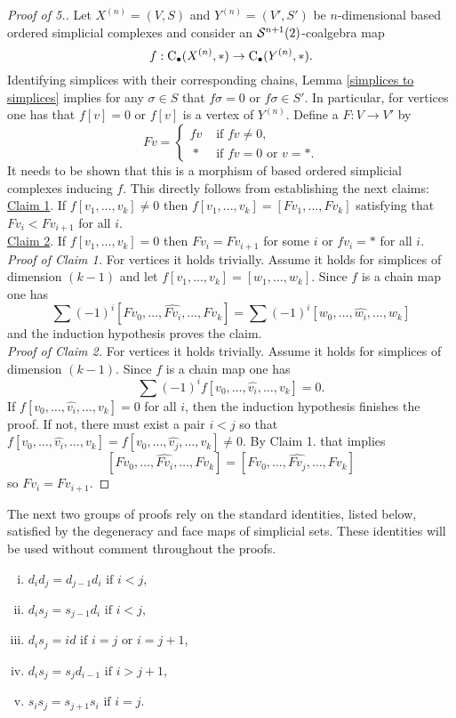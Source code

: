 \documentclass[main.tex]{subfiles}
\begin{document}
\begin{proof}[Proof of 5.]
Let $X^{(n)}=(V,S)$ and $Y^{(n)}=(V',S')$ be $n$-dimensional based ordered simplicial complexes and consider an $\S^{n+1}(2)$-coalgebra map $$f:\chains(X^{(n)},\ast)\to\chains(Y^{(n)},\ast).$$
Identifying simplices with their corresponding chains, Lemma \ref{simplices to simplices} implies for any $\sigma\in S$ that $f\sigma=0$ or $f\sigma\in S'$. In particular, for vertices one has that $f[v]=0$ or $f[v]$ is a vertex of $Y^{(n)}$. Define a $F:V\to V'$ by
$$Fv=\begin{cases}fv & \text{ if } fv\neq0, \\ \ \ast & \text{ if } fv=0 \text{ or } v=\ast.\end{cases}$$
It needs to be shown that this is a morphism of based ordered simplicial complexes inducing $f$. This directly follows from establishing the next \vspace*{5pt}claims:
\underline{Claim 1}. If $f[v_1,...,v_k]\neq0$ then $f[v_1,...,v_k]=[Fv_1,...,Fv_k]$ satisfying that $Fv_i<Fv_{i+1}$ for all $i$. \vspace*{5pt} \\
\underline{Claim 2}. If $f[v_1,...,v_k]=0$ then $Fv_{i}=Fv_{i+1}$ for some $i$ or $fv_i=\ast$ for all $i$.\vspace*{9pt} \\
\textit{Proof of Claim 1.} For vertices it holds trivially. Assume it holds for simplices of dimension $(k-1)$ and let $f[v_1,...,v_k]=[w_1,\dotsc,w_k]$. Since $f$ is a chain map one has
$$\sum(-1)^i[Fv_0,\dotsc,\widehat{Fv_i},\dotsc,Fv_k]=\sum(-1)^i[w_0,\dotsc,\widehat{w_i},\dotsc,w_k]$$
and the induction hypothesis proves the claim.\vspace*{9pt} \\
\textit{Proof of Claim 2.} For vertices it holds trivially. Assume it holds for simplices of dimension $(k-1)$. Since $f$ is a chain map one has
$$\sum(-1)^if[v_0,\dotsc,\widehat{v_i},\dotsc,v_k]=0.$$
If $f[v_0,\dotsc,\widehat{v_i},\dotsc,v_k]=0$ for all $i$, then the induction hypothesis finishes the proof. If not, there must exist a pair $i<j$ so that $f[v_0,\dotsc,\widehat{v_i},\dotsc,v_k]=f[v_0,\dotsc,\widehat{v_j},\dotsc,v_k]\neq0$. By Claim 1. that implies $$[Fv_0,\dotsc,\widehat{Fv_i},\dotsc,Fv_k]=[Fv_0,\dotsc,\widehat{Fv_j},\dotsc,Fv_k]$$ so $Fv_i=Fv_{i+1}$.
\end{proof}

The next two groups of proofs rely on the standard identities, listed below, satisfied by the degeneracy and face maps of simplicial sets. These identities will be used without comment throughout the proofs.
\begin{enumerate}[i)]
\item $d_i d_j = d_{j-1} d_i \text{ if } i < j$,
\item $d_i s_j = s_{j-1} d_i \text{ if } i < j$,
\item $d_i s_j = id \text{ if } i = j \text{ or } i = j + 1$,
\item $d_i s_j = s_j d_{i-1} \text{ if } i > j + 1$,
\item $s_i s_j = s_{j+1} s_i \text{ if } i = j$.
\end{enumerate}
\end{document}
